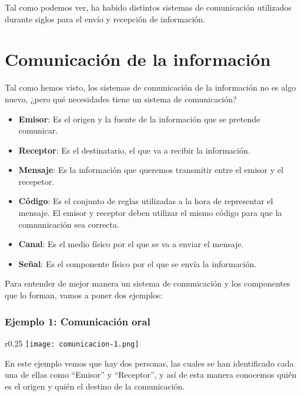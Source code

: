 Tal como podemos ver, ha habido distintos sistemas de comunicación utilizados durante siglos para el envío y recepción de información.

\section{Comunicación de la información}

Tal como hemos visto, los sistemas de comunicación de la información no es algo nuevo, ¿pero qué necesidades tiene un sistema de comunicación?

\begin{itemize}
    \item \textbf{Emisor}: Es el origen y la fuente de la información que se pretende comunicar.
    \item \textbf{Receptor}: Es el destinatario, el que va a recibir la información.
    \item \textbf{Mensaje}: Es la información que queremos transmitir entre el emisor y el recepetor.
    \item \textbf{Código}: Es el conjunto de reglas utilizadas a la hora de representar el mensaje. El emisor y receptor deben utilizar el mismo código para que la comnunicación sea correcta.
    \item \textbf{Canal}: Es el medio físico por el que se va a enviar el mensaje.
    \item \textbf{Señal}: Es el componente físico por el que se envía la información.
\end{itemize}

Para entender de mejor manera un sistema de comunicación y los componentes que lo forman, vamos a poner dos ejemplos:

\subsubsection*{Ejemplo 1: Comunicación oral}

\begin{wrapfigure}{r}{0.25\linewidth}
    \centering
    \vspace{-35pt}
    \texttt{[image: comunicacion-1.png]}
    \vspace{-30pt}
\end{wrapfigure}
En este ejemplo vemos que hay dos personas, las cuales se han identificado cada una de ellas como “Emisor” y “Receptor”, y así de esta manera conocemos quién es el origen y quién el destino de la comunicación.


